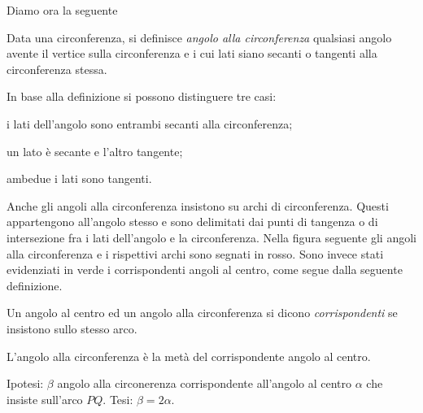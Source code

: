 Diamo ora la seguente
\begin{definizione}
Data una circonferenza, si definisce \emph{angolo alla circonferenza} qualsiasi angolo avente il vertice sulla circonferenza e i cui lati siano secanti o tangenti alla circonferenza stessa. 
\end{definizione}
In base alla definizione si possono distinguere tre casi:
\begin{itemize*}
\item i lati dell'angolo sono entrambi secanti alla circonferenza;
\item un lato è secante e l'altro tangente;
\item ambedue i lati sono tangenti.
\end{itemize*}
Anche gli angoli alla circonferenza insistono su archi di circonferenza. Questi appartengono all'angolo stesso e sono delimitati dai punti di tangenza o di intersezione fra i lati dell'angolo e la circonferenza. Nella figura seguente gli angoli alla circonferenza e i rispettivi archi sono segnati in rosso. Sono invece stati evidenziati in verde i corrispondenti angoli al centro, come segue dalla seguente definizione.
\begin{definizione}
Un angolo al centro ed un angolo alla circonferenza si dicono \emph{corrispondenti} se insistono sullo stesso arco.
\end{definizione}


\begin{teorema}
L'angolo alla circonferenza è la metà del corrispondente angolo al centro.
\end{teorema}

\noindent Ipotesi: $\beta$ angolo alla circonerenza corrispondente all'angolo al centro $\alpha$ che insiste sull'arco $PQ$.\tab 
Tesi: $\beta = 2\alpha$.


